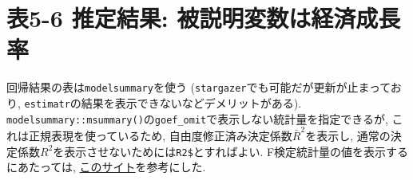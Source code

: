 \documentclass[
]{book}
\begin{document}
\hypertarget{table5-6}{%
\section*{表5-6 推定結果: 被説明変数は経済成長率}\label{table5-6}}

回帰結果の表は\texttt{modelsummary}を使う (\texttt{stargazer}でも可能だが更新が止まっており, \texttt{estimatr}の結果を表示できないなどデメリットがある). \texttt{modelsummary::msummary()}の\texttt{goef\_omit}で表示しない統計量を指定できるが, これは正規表現を使っているため, 自由度修正済み決定係数\(\bar{R}^2\)を表示し, 通常の決定係数\(R^2\)を表示させないためには\texttt{R2\$}とすればよい. F検定統計量の値を表示するにあたっては, \href{https://stackoverflow.com/questions/69582118/extracting-information-from-r-objects-and-importing-it-to-a-modelsummary-table}{このサイト}を参考にした.
\end{document}
